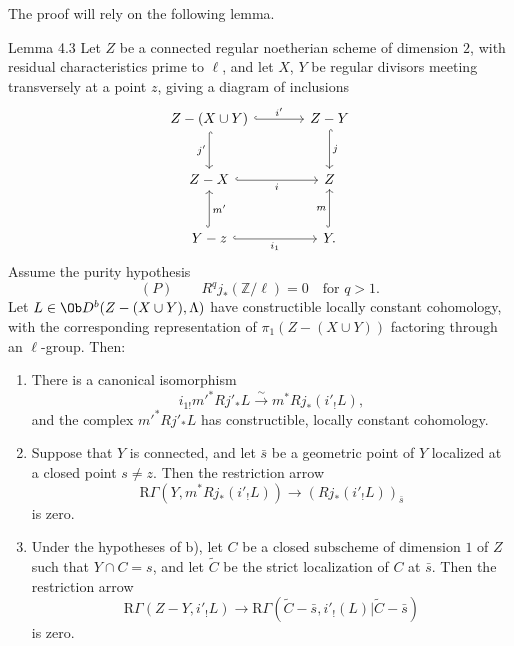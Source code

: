 The proof will rely on the following lemma.

\begin{statement}{Lemma 4.3}
Let $Z$ be a connected regular noetherian scheme of dimension $2$, with residual characteristics prime to $\ell$, and let $X$, $Y$ be regular divisors meeting transversely at a point $z$, giving a diagram of inclusions
\[
\begin{tikzcd}[column sep=large,row sep=large]
Z-(X\cup Y) \arrow[r,hook,"i'"] \arrow[d,hook,"j'"'] & Z-Y \arrow[d,hook,"j"]\\
Z-X \arrow[r,hook,"i"'] & Z\\
Y-z \arrow[r,hook,"i_1"'] \arrow[u,hook,"m'"'] & Y \arrow[u,hook,"m"] .
\end{tikzcd}
\]
Assume the purity hypothesis
\[
(P)\qquad R^qj_*(\mathbb Z/\ell)=0\quad\text{for }q>1.
\]
Let $L\in\Ob D^b(Z-(X\cup Y),\Lambda)$ have constructible locally constant cohomology, with the corresponding representation of $\pi_1(Z-(X\cup Y))$ factoring through an $\ell$-group. Then:
\begin{enumerate}[label=\alph*)]
\item There is a canonical isomorphism
\[
i_{1!}m'^*Rj'_*L\xrightarrow{\sim} m^*Rj_*(i'_!L),
\]
and the complex $m'^*Rj'_*L$ has constructible, locally constant cohomology.
\item Suppose that $Y$ is connected, and let $\bar s$ be a geometric point of $Y$ localized at a closed point $s\ne z$. Then the restriction arrow
\begin{equation}
\mathrm R\Gamma(Y,m^*Rj_*(i'_!L))\longrightarrow (Rj_*(i'_!L))_{\bar s}
\tag{4.3.1}
\end{equation}
is zero.
\item Under the hypotheses of b), let $C$ be a closed subscheme of dimension $1$ of $Z$ such that $Y\cap C=s$, and let $\widetilde C$ be the strict localization of $C$ at $\bar s$. Then the restriction arrow
\begin{equation}
\mathrm R\Gamma(Z-Y,i'_!L)
\longrightarrow
\mathrm R\Gamma(\widetilde C-\bar s,i'_!(L)|\widetilde C-\bar s)
\tag{4.3.2}
\end{equation}
is zero.
\end{enumerate}
\end{statement}

